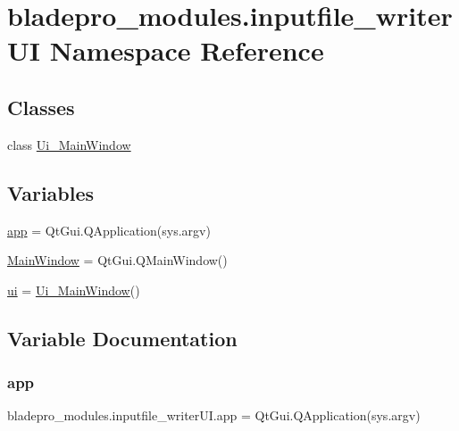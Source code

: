 \hypertarget{namespacebladepro__modules_1_1inputfile__writer_u_i}{}\section{bladepro\+\_\+modules.\+inputfile\+\_\+writer\+UI Namespace Reference}
\label{namespacebladepro__modules_1_1inputfile__writer_u_i}
\subsection*{Classes}
\begin{DoxyCompactItemize}
\item 
class \hyperlink{classbladepro__modules_1_1inputfile__writer_u_i_1_1_ui___main_window}{Ui\+\_\+\+Main\+Window}
\end{DoxyCompactItemize}
\subsection*{Variables}
\begin{DoxyCompactItemize}
\item 
\hyperlink{namespacebladepro__modules_1_1inputfile__writer_u_i_abb2f696d468ab34ad27b9d0c256b8e72}{app} = Qt\+Gui.\+Q\+Application(sys.\+argv)
\item 
\hyperlink{namespacebladepro__modules_1_1inputfile__writer_u_i_ab649489a40967421c06970ba9ffeef53}{Main\+Window} = Qt\+Gui.\+Q\+Main\+Window()
\item 
\hyperlink{namespacebladepro__modules_1_1inputfile__writer_u_i_ad10cb13360f604c82c202259b73f747b}{ui} = \hyperlink{classbladepro__modules_1_1inputfile__writer_u_i_1_1_ui___main_window}{Ui\+\_\+\+Main\+Window}()
\end{DoxyCompactItemize}


\subsection{Variable Documentation}
\hypertarget{namespacebladepro__modules_1_1inputfile__writer_u_i_abb2f696d468ab34ad27b9d0c256b8e72}{}\label{namespacebladepro__modules_1_1inputfile__writer_u_i_abb2f696d468ab34ad27b9d0c256b8e72} 
\subsubsection{\texorpdfstring{app}{app}}
{\footnotesize\ttfamily bladepro\+\_\+modules.\+inputfile\+\_\+writer\+U\+I.\+app = Qt\+Gui.\+Q\+Application(sys.\+argv)}

